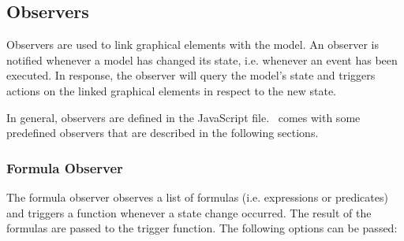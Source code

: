 %
%

\subsection{Observers}

Observers are used to link graphical elements with the model. 
An observer is notified whenever a model has changed its state, i.e. whenever an event has been executed. 
In response, the observer will query the model's state and triggers actions on the linked graphical elements in respect to the new state. 

In general, observers are defined in the JavaScript file. 
\bms~comes with some predefined observers that are described in the following sections.

\subsubsection{Formula Observer}

The formula observer observes a list of formulas (i.e. expressions or predicates) and triggers a function whenever a state change occurred.
The result of the formulas are passed to the trigger function.
The following options can be passed:

